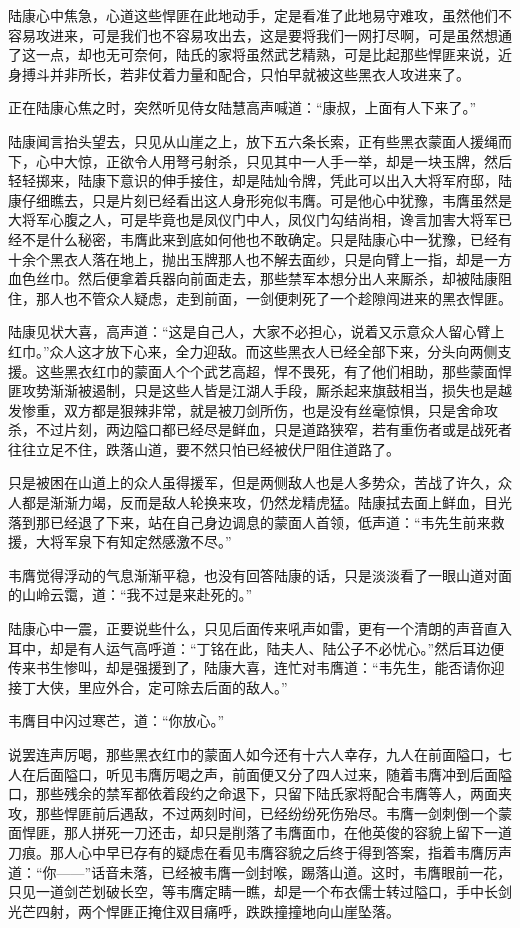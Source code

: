 陆康心中焦急，心道这些悍匪在此地动手，定是看准了此地易守难攻，虽然他们不容易攻进来，可是我们也不容易攻出去，这是要将我们一网打尽啊，可是虽然想通了这一点，却也无可奈何，陆氏的家将虽然武艺精熟，可是比起那些悍匪来说，近身搏斗并非所长，若非仗着力量和配合，只怕早就被这些黑衣人攻进来了。

正在陆康心焦之时，突然听见侍女陆慧高声喊道：“康叔，上面有人下来了。”

陆康闻言抬头望去，只见从山崖之上，放下五六条长索，正有些黑衣蒙面人援绳而下，心中大惊，正欲令人用弩弓射杀，只见其中一人手一举，却是一块玉牌，然后轻轻掷来，陆康下意识的伸手接住，却是陆灿令牌，凭此可以出入大将军府邸，陆康仔细瞧去，只是片刻已经看出这人身形宛似韦膺。可是他心中犹豫，韦膺虽然是大将军心腹之人，可是毕竟也是凤仪门中人，凤仪门勾结尚相，谗言加害大将军已经不是什么秘密，韦膺此来到底如何他也不敢确定。只是陆康心中一犹豫，已经有十余个黑衣人落在地上，抛出玉牌那人也不解去面纱，只是向臂上一指，却是一方血色丝巾。然后便拿着兵器向前面走去，那些禁军本想分出人来厮杀，却被陆康阻住，那人也不管众人疑虑，走到前面，一剑便刺死了一个趁隙闯进来的黑衣悍匪。

陆康见状大喜，高声道：“这是自己人，大家不必担心，说着又示意众人留心臂上红巾。”众人这才放下心来，全力迎敌。而这些黑衣人已经全部下来，分头向两侧支援。这些黑衣红巾的蒙面人个个武艺高超，悍不畏死，有了他们相助，那些蒙面悍匪攻势渐渐被遏制，只是这些人皆是江湖人手段，厮杀起来旗鼓相当，损失也是越发惨重，双方都是狠辣非常，就是被刀剑所伤，也是没有丝毫惊惧，只是舍命攻杀，不过片刻，两边隘口都已经尽是鲜血，只是道路狭窄，若有重伤者或是战死者往往立足不住，跌落山道，要不然只怕已经被伏尸阻住道路了。

只是被困在山道上的众人虽得援军，但是两侧敌人也是人多势众，苦战了许久，众人都是渐渐力竭，反而是敌人轮换来攻，仍然龙精虎猛。陆康拭去面上鲜血，目光落到那已经退了下来，站在自己身边调息的蒙面人首领，低声道：“韦先生前来救援，大将军泉下有知定然感激不尽。”

韦膺觉得浮动的气息渐渐平稳，也没有回答陆康的话，只是淡淡看了一眼山道对面的山岭云霭，道：“我不过是来赴死的。”

陆康心中一震，正要说些什么，只见后面传来吼声如雷，更有一个清朗的声音直入耳中，却是有人运气高呼道：“丁铭在此，陆夫人、陆公子不必忧心。”然后耳边便传来书生惨叫，却是强援到了，陆康大喜，连忙对韦膺道：“韦先生，能否请你迎接丁大侠，里应外合，定可除去后面的敌人。”

韦膺目中闪过寒芒，道：“你放心。”

说罢连声厉喝，那些黑衣红巾的蒙面人如今还有十六人幸存，九人在前面隘口，七人在后面隘口，听见韦膺厉喝之声，前面便又分了四人过来，随着韦膺冲到后面隘口，那些残余的禁军都依着段约之命退下，只留下陆氏家将配合韦膺等人，两面夹攻，那些悍匪前后遇敌，不过两刻时间，已经纷纷死伤殆尽。韦膺一剑刺倒一个蒙面悍匪，那人拼死一刀还击，却只是削落了韦膺面巾，在他英俊的容貌上留下一道刀痕。那人心中早已存有的疑虑在看见韦膺容貌之后终于得到答案，指着韦膺厉声道：“你——”话音未落，已经被韦膺一剑封喉，踢落山道。这时，韦膺眼前一花，只见一道剑芒划破长空，等韦膺定睛一瞧，却是一个布衣儒士转过隘口，手中长剑光芒四射，两个悍匪正掩住双目痛呼，跌跌撞撞地向山崖坠落。

